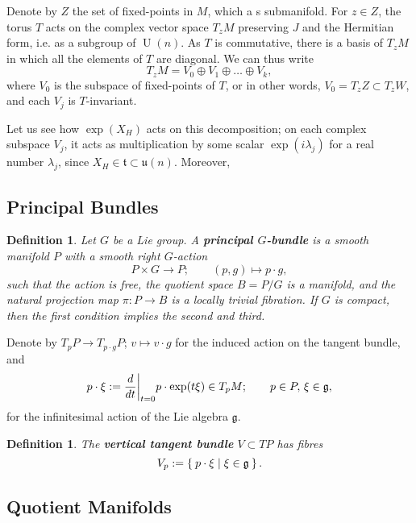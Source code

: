 \documentclass{article}
\newtheorem{defn}[theorem]{Definition\rm}
\newcommand{\ra}{\rightarrow}
\newcommand{\mfg}{\mathfrak{g}}
\newcommand{\mft}{\mathfrak{t}}
\newcommand{\mf}[1]{\mathfrak{#1}}
\DeclareMathOperator{\UU}{U}
\newcommand\restr[2]{{%
		\left.\kern-\nulldelimiterspace %
		#1 %
		\vphantom{\big|} %
		\right|_{#2} %
}}
\begin{document}
	Denote by $Z$ the set of fixed-points in $M$, which a s submanifold. For $z \in Z$, the torus $T$ acts on the complex vector space $T_{z}M$ preserving $J$ and the Hermitian form, i.e. as a subgroup of $\UU(n)$. As $T$ is commutative, there is a basis of $T_{z}M$ in which all the elements of $T$ are diagonal. We can thus write
	\[
		T_{z}M = V_{0} \oplus V_{1} \oplus \ldots \oplus V_{k},
	\]
	where $V_{0}$ is the subspace of fixed-points of $T$, or in other words, $V_{0} = T_{z}Z \subset T_{z}W$, and each $V_{j}$ is $T$-invariant.
	
	Let us see how $\exp(X_{H})$ acts on this decomposition; on each complex subspace $V_{j}$, it acts as multiplication by some scalar $\exp(i\lambda_{j})$ for a real number $\lambda_{j}$, since $X_{H} \in \mft \subset \mf{u}(n)$. Moreover, 














	\subsection{Principal Bundles}
	
	\begin{defn}
		Let $G$ be a Lie group. A \textbf{principal $G$-bundle} is a smooth manifold $P$ with a smooth right $G$-action 
		\[
		P \times G \ra P; \qquad (p,g) \longmapsto p \cdot g,
		\]
		such that the action is free, the quotient space $B = P/G$ is a manifold, and the natural projection map $\pi : P \ra B$ is a locally trivial fibration. If $G$ is compact, then the first condition implies the second and third.
	\end{defn}
	
	Denote by $T_{p}P \ra T_{p\cdot g}P$; $v \mapsto v \cdot g$ for the induced action on the tangent bundle, and
	\[
		p \cdot \xi := \restr{\frac{d}{dt}}{t = 0} p \cdot \exp(t\xi) \in T_{p}M; \qquad p \in P,\, \xi \in \mfg,
	\]
	for the infinitesimal action of the Lie algebra $\mfg$. 
	
	\begin{defn}
		The \textbf{vertical tangent bundle} $V \subset TP$ has fibres
		\[
			V_{p} := \Set{ p \cdot \xi | \xi \in \mfg}.
		\]
	\end{defn}
	
	\subsection{Quotient Manifolds}
	
\end{document}
